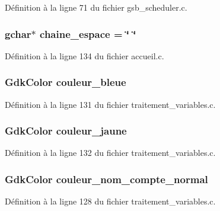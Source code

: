 Définition à la ligne 71 du fichier gsb\_\-scheduler.c.

\subsubsection[{chaine\_\-espace}]{\setlength{\rightskip}{0pt plus 5cm}gchar$\ast$ {\bf chaine\_\-espace} = \char`\"{} \char`\"{}}\label{accueil_8c_a0a186a4f6ba30156f2d8ff8025328371}


Définition à la ligne 134 du fichier accueil.c.

\subsubsection[{couleur\_\-bleue}]{\setlength{\rightskip}{0pt plus 5cm}GdkColor {\bf couleur\_\-bleue}}\label{accueil_8c_abf8bca2fdf4d7ff487314637a68d8ca1}


Définition à la ligne 131 du fichier traitement\_\-variables.c.

\subsubsection[{couleur\_\-jaune}]{\setlength{\rightskip}{0pt plus 5cm}GdkColor {\bf couleur\_\-jaune}}\label{accueil_8c_ab8c7a6a865f85f0e0ed7ba712c688552}


Définition à la ligne 132 du fichier traitement\_\-variables.c.

\subsubsection[{couleur\_\-nom\_\-compte\_\-normal}]{\setlength{\rightskip}{0pt plus 5cm}GdkColor {\bf couleur\_\-nom\_\-compte\_\-normal}}\label{accueil_8c_afefd0503b07889ace94c105384b52c3b}


Définition à la ligne 128 du fichier traitement\_\-variables.c.

